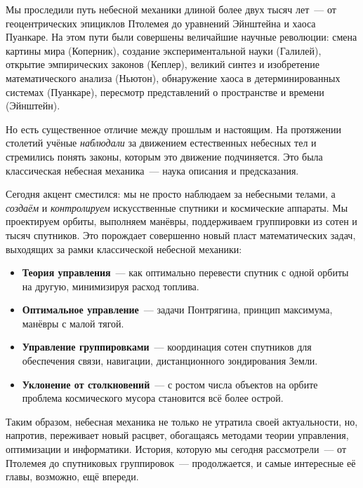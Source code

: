 \documentclass[12pt,a4paper]{article}
\begin{document}
Мы проследили путь небесной механики длиной более двух тысяч лет~--- от
геоцентрических эпициклов Птолемея до уравнений Эйнштейна и хаоса Пуанкаре.
На этом пути были совершены величайшие научные революции: смена картины мира
(Коперник), создание экспериментальной науки (Галилей), открытие
эмпирических законов (Кеплер), великий синтез и изобретение математического
анализа (Ньютон), обнаружение хаоса в детерминированных системах (Пуанкаре),
пересмотр представлений о пространстве и времени (Эйнштейн).

Но есть существенное отличие между прошлым и настоящим. На протяжении
столетий учёные \emph{наблюдали} за движением естественных небесных тел и
стремились понять законы, которым это движение подчиняется. Это была
классическая небесная механика~--- наука описания и предсказания.

Сегодня акцент сместился: мы не просто наблюдаем за небесными телами, а
\emph{создаём} и \emph{контролируем} искусственные спутники и космические
аппараты. Мы проектируем орбиты, выполняем манёвры, поддерживаем
группировки из сотен и тысяч спутников. Это порождает совершенно новый
пласт математических задач, выходящих за рамки классической небесной
механики:
\begin{itemize}
  \item \textbf{Теория управления}~--- как оптимально перевести спутник
    с одной орбиты на другую, минимизируя расход топлива.
  \item \textbf{Оптимальное управление}~--- задачи Понтрягина, принцип
    максимума, манёвры с малой тягой.
  \item \textbf{Управление группировками}~--- координация сотен спутников
    для обеспечения связи, навигации, дистанционного зондирования Земли.
  \item \textbf{Уклонение от столкновений}~--- с ростом числа объектов на
    орбите проблема космического мусора становится всё более острой.
\end{itemize}

Таким образом, небесная механика не только не утратила своей актуальности,
но, напротив, переживает новый расцвет, обогащаясь методами теории
управления, оптимизации и информатики. История, которую мы сегодня
рассмотрели~--- от Птолемея до спутниковых группировок~--- продолжается, и
самые интересные её главы, возможно, ещё впереди.
\end{document}
